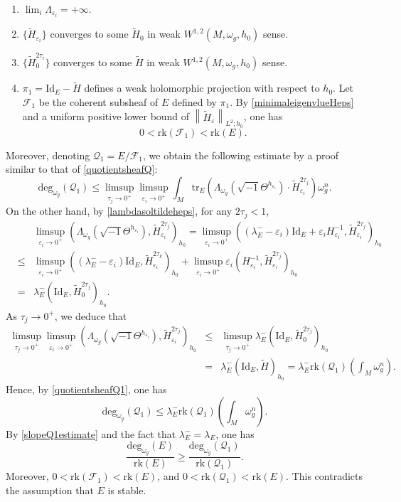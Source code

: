 \documentclass[12pt, reqno]{amsart}
\newcommand\cF{{\mathcal F}}
\theoremstyle{plain}
\theoremstyle{definition}
\newcommand{\sq}{\sqrt{-1}}
\newcommand{\eps}{\varepsilon}
\newcommand{\beq}{\begin{equation}}
\newcommand{\eeq}{\end{equation}}
\newcommand{\ee}{\end{eqnarray*}}
\newcommand{\be}{\begin{eqnarray*}}
\newcommand{\bd}{\begin{enumerate}}
\newcommand{\ed}{\end{enumerate}}
\renewcommand{\tilde}{\widetilde}
\renewcommand{\>}{\rightarrow}
\renewcommand{\>}{\rightarrow}
\newcommand{\om}{\omega}
\renewcommand{\tilde}{\widetilde}
\newcommand{\tr}{\mathrm{tr}}
\numberwithin{equation}{section} %
\begin{document}
\bd\item $\lim_i\Lambda_{\eps_i}=+\infty$.
\item $ \{\tilde H_{\eps_i}\}$ converges to  some  $\tilde H_0$ in weak $ W^{1,2}(M, \omega_g, h_0) $ sense.
\item$ \{\tilde H^{2\tau_i}_0\}$ converges to some $ \tilde H $ in weak $ W^{1,2}(M, \omega_g, h_0) $ sense.
\item$ \pi_1 = \mathrm{Id}_E - \tilde H $ defines a weak holomorphic projection with respect to $ h_0 $. Let $\cF_1$ be the coherent subsheaf of $E$ defined by $\pi_1$. By \eqref{minimaleigenvlueHeps} and a uniform positive lower bound of $\left\|\tilde H_\eps\right\|_{L^2;h_0}$,  one has
\beq 0 < \mathrm{rk}(\mathscr{F}_1) < \mathrm{rk}(E).\eeq \ed
Moreover, denoting $\mathscr{Q}_1 = E/\mathcal{F}_1$,  we obtain the
following estimate by a proof similar to that of
\eqref{quotientsheafQ}: \beq \label{quotientsheafQ1}
\mathrm{deg}_{\omega_g}(\mathscr{Q}_1) \leq \limsup_{\tau_j \>
	0^+}\limsup_{\eps_i \> 0^+}\int_M\tr_E\left(\Lambda_{\om_g}\left(\sq
\Theta^{h_{\eps_i}}\right)\cdot \tilde
H_{\eps_i}^{2\tau_j}\right)\om_g^n. \eeq On the other hand, by
\eqref{lambdasoltildeheps}, for any $ 2\tau_j < 1 $,
\be && \limsup_{\eps_i \> 0^+} \left(\Lambda_{\om_g}\left(\sq \Theta^{h_{\eps_i}}\right), \tilde H_{\eps_i}^{2\tau_j}\right)_{h_0} = \limsup_{\eps_i \> 0^+} \left((\lambda_E^--\eps_i)\mathrm{Id}_E + \eps_i H_{\eps_i}^{-1}, \tilde H_{\eps_i}^{2\tau_j}\right)_{h_0} \\
& \leq & \limsup_{\eps_i \> 0^+} \left((\lambda_E^- -\eps_i)\mathrm{Id}_E, \tilde H_{\eps_i}^{2\tau_k}\right)_{h_0} + \limsup_{\eps_i \> 0^+} \eps_i\left(H_{\eps_i}^{-1}, \tilde H_{\eps_i}^{2\tau_j}\right)_{h_0} \\
& = & \lambda_E^-\left(\mathrm{Id}_E,\tilde
H^{2\tau_j}_0\right)_{h_0}. \ee As $ \tau_j \> 0^+ $, we deduce that
\be \limsup_{\tau_j \> 0^+}\limsup_{\eps_i \> 0^+}
\left(\Lambda_{\om_g}\left(\sq \Theta^{h_{\eps_i}}\right), \tilde
H_{\eps_i}^{2\tau_j}\right)_{h_0}
& \leq & \limsup_{\tau_j \> 0^+}\lambda_E^- \left(\mathrm{Id}_E,\tilde H^{2\tau_j}_0\right)_{h_0} \\
& = & \lambda_E^-\left(\mathrm{Id}_E, \tilde H \right)_{h_0} =
\lambda_E^-\mathrm{rk}(\mathscr{Q}_1)\left(\int_M \omega_g^n\right).
\ee Hence, by \eqref{quotientsheafQ1}, one has \beq
\label{slopeQ1estimate}  \mathrm{deg}_{\omega_g}(\mathscr{Q}_1) \leq
\lambda_E^-\mathrm{rk}(\mathscr{Q}_1)\left(\int_M \omega_g^n\right).
\eeq By \eqref{slopeQ1estimate} and the fact that $
\lambda_E^-=\lambda_E $, one has \beq
\frac{\mathrm{deg}_{\omega_g}(E)}{\mathrm{rk}(E)} \geq
\frac{\mathrm{deg}_{\omega_g}(\mathscr{Q}_1)}{\mathrm{rk}(\mathscr{Q}_1)}.
\eeq
Moreover, $ 0 < \mathrm{rk}(\mathscr{F}_1) < \mathrm{rk}(E) $,  and $ 0 < \mathrm{rk}(\mathscr{Q}_1) < \mathrm{rk}(E) $. This contradicts the assumption that $ E $ is stable. \\
\end{document}
